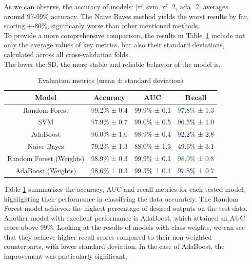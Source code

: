 \documentclass[conference]{IEEEtran}
\begin{document}
As we can observe, the accuracy of models: [rf, svm, rf\_2, ada\_2] averages around 97-99\% accuracy.
The Naive Bayes method yields the worst results by far, scoring +-80\%, significanly worse than other
mentioned methods.
\\ 

To provide a more comprehensive comparison, the results in Table~\ref{AUC_tab} include not only the average values of key metrics,  
but also their standard deviations, calculated across all cross-validation folds. \\
The lower the SD, the more stable and reliable behavior of the model is.


\begin{table}[H]
    \caption{Evaluation metrics (mean ± standard deviation)}
    \begin{center}
        \begin{tabular}{|c|c|c|c|}
            \hline
            \textbf{Model} & \textbf{Accuracy} & \textbf{AUC} & \textbf{Recall}  \\
            \hline
            Random Forest & 99.2\% ± 0.4 & 99.9\% ± 0.1 & \textcolor{green}{97.8\% ± 1.3}  \\
            SVM & 97.9\% ± 0.7 & 99.0\% ± 0.5 & 96.5\% ± 1.0 \\
            AdaBoost & 96.0\% ± 1.0 & 98.9\% ± 0.4 & \textcolor{blue}{92.2\% ± 2.8}  \\
            Naive Bayes & 79.2\% ± 1.3 & 88.0\% ± 1.3 & 49.6\% ± 3.1 \\
            Random Forest (Weights) & 98.9\% ± 0.3 & 99.9\% ± 0.1 & \textcolor{green}{98.0\% ± 0.8} \\
            AdaBoost (Weights) & 98.6\% ± 0.3 & 99.3\% ± 0.4 & \textcolor{blue}{97.8\% ± 0.7} \\
            \hline
        \end{tabular}
    \end{center}
    \label{AUC_tab}
\end{table}
Table \ref{AUC_tab} summarizes the accuracy, AUC and recall metrics
for each tested model, highlighting their performance in
classifying the data accurately. The Random Forest model achieved
the highest percentage of desired outputs on the test data.
Another model with excellent performance is AdaBoost,
which attained an AUC score above 99\%. 
Looking at the results of models with class weights, 
we can see that they achieve higher recall scores compared to their non-weighted counterparts, with lower standard deviation.
In the case of AdaBoost, the improvement was particularly significant,
\end{document}
